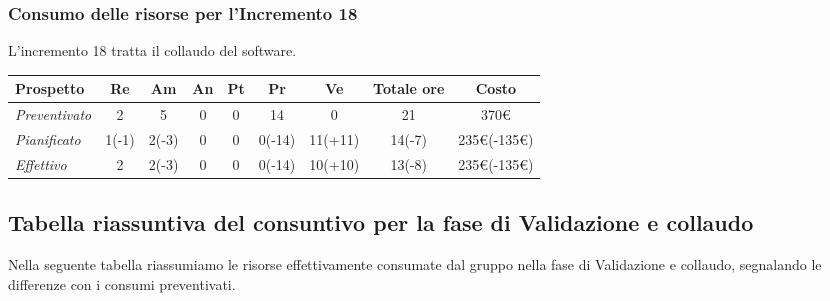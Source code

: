 {{{{{{{{{{{{{{{{{{\subsubsection{Consumo delle risorse per l'Incremento 18}
L'incremento 18 tratta il collaudo del software.
\quad
\def\tabularxcolumn#1{m{#1}}
{

	\begin{center}
		\renewcommand{\arraystretch}{1.4}
		\begin{tabularx}{\textwidth}{|X|c|c|c|c|c|c|c|c|}
			\hline
			\rowcolor{airforceblue}
			\textbf{Prospetto} & \textbf{Re} & \textbf{Am} & \textbf{An} & \textbf{Pt} & \textbf{Pr} & \textbf{Ve} & \textbf{Totale ore} & \textbf{Costo} \\
			\hline
			\textit{Preventivato}& 2 & 5 & 0 & 0 & 14 & 0 & 21 & 370\euro\\
			\hline
			\textit{Pianificato} & 1(-1) & 2(-3) & 0 & 0 & 0(-14) & 11(+11) & 14(-7) & 235\euro(-135\euro) \\
			\hline
			\textit{Effettivo} & 2 & 2(-3) & 0 & 0 & 0(-14) & 10(+10) & 13(-8) & 235\euro(-135\euro) \\
			\hline
		\end{tabularx}
	\end{center}


\clearpage
\subsection{Tabella riassuntiva del consuntivo per la fase di Validazione e collaudo}

Nella seguente tabella riassumiamo le risorse effettivamente consumate dal gruppo nella fase di Validazione e collaudo, segnalando le differenze con i consumi preventivati.

\quad
\def\tabularxcolumn#1{m{#1}}
{

}}}}}}}}}}}}}}}}}}}}
